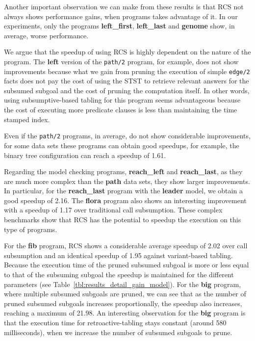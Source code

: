 Another important observation we can make from these results is that RCS not always shows performance gains, when
programs takes advantage of it. In our experiments, only the programs \textbf{left\_first}, \textbf{left\_last} and
\textbf{genome} show, in average, worse performance.

We argue that the speedup of using RCS is highly dependent on the nature of the program. The \textbf{left} version
of the \texttt{path/2} program, for example, does not show improvements because what we gain from pruning the
execution of simple \texttt{edge/2} facts does not pay the cost of using the STST to retrieve relevant answers
for the subsumed subgoal and the cost of pruning the computation itself. In other words, using subsumptive-based
tabling for this program seems advantageous because the cost of executing more predicate clauses is less than
maintaining the time stamped index.

Even if the \texttt{path/2} programs, in average, do not show considerable improvements, for some data sets these
programs can obtain good speedups, for example, the binary tree configuration can reach a speedup of 1.61.

Regarding the model checking programs, \textbf{reach\_left} and \textbf{reach\_last}, as they are much more complex
than the \textbf{path} data sets, they show larger improvements. In particular, for the \textbf{reach\_last} program
with the \textbf{leader} model, we obtain a good speedup of 2.16. The \textbf{flora} program also shows an interesting
improvement with a speedup of 1.17 over traditional call subsumption. These complex benchmarks show that RCS has the
potential to speedup the execution on this type of programs.

For the \textbf{fib} program, RCS shows a considerable average speedup of 2.02 over call subsumption and an identical
speedup of 1.95 against variant-based tabling. Because the execution time of the pruned subsumed subgoal is more or less
equal to that of the subsuming subgoal the speedup is maintained for the different parameters (see 
Table~\ref{tbl:results_detail_gain_model}). For the \textbf{big} program, where multiple subsumed subgoals are
pruned, we can see that as the number of pruned subsumed subgoals increases proportionally, the speedup also increases,
reaching a maximum of 21.98. An interesting observation for the \textbf{big} program is that the execution time for
retroactive-tabling stays constant (around 580 milliseconds), when we increase the number of subsumed subgoals to prune.

